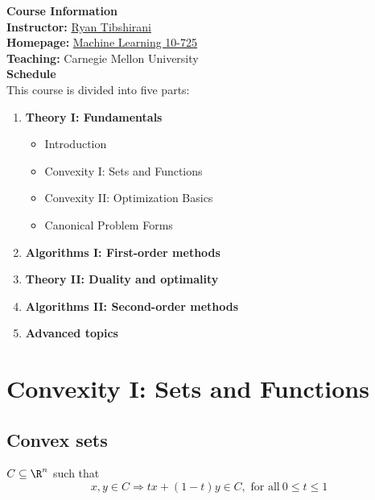 \documentclass[a4paper]{article}
\def\nlecturer {Ryan Tibshirani}
\begin{document}
\maketitle
{\small
\noindent\textbf{Course Information}\\ 
\indent \textbf{Instructor:} \textcolor{blue}{\href{https://www.stat.berkeley.edu/~ryantibs/index.html}{\nlecturer}} \\
\indent\textbf{Homepage:} \textcolor{blue}{\href{https://www.stat.cmu.edu/~ryantibs/convexopt/}{Machine Learning 10-725}} \\
\indent\textbf{Teaching:} Carnegie Mellon University \\

\vspace{10pt}
\noindent\textbf{Schedule}\\
\indent This course is divided into five parts: 
\begin{enumerate}
    \item \textbf{Theory I: Fundamentals}
    \begin{itemize}
        \item Introduction
        \item Convexity I: Sets and Functions
        \item Convexity II: Optimization Basics
        \item Canonical Problem Forms
    \end{itemize}
    \item \textbf{Algorithms I: First-order methods}
    \item \textbf{Theory II: Duality and optimality}
    \item \textbf{Algorithms II: Second-order methods}
    \item \textbf{Advanced topics}
\end{enumerate}

\tableofcontents


\section{Convexity I: Sets and Functions}
\subsection{Convex sets}
\begin{defi}
  $C \subseteq \R^n$ such that 
  \[
      x, y \in C \Longrightarrow  tx + (1-t)y \in C,\text{\ for\ all}\ 0 \leq t \leq 1 
  \]
\end{defi}

}
\end{document}
